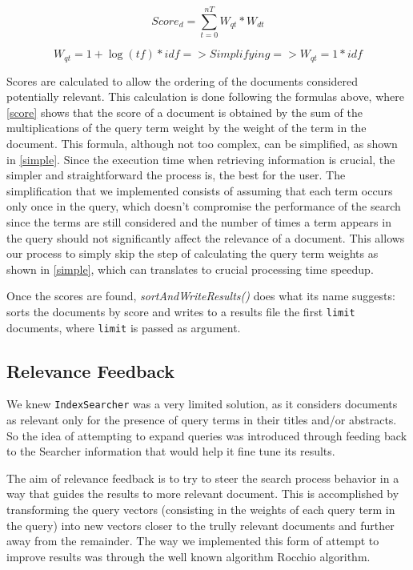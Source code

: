 \documentclass[12pt]{article}
\begin{document}
\begin{equation}
  \label{score}
  Score_{d} = \sum_{t=0}^{nT} W_{qt} * W_{dt}
\end{equation}

\begin{equation}
  \label{simple}
  W_{qt} = 1 + \log(tf) * idf => Simplifying => W_{qt} = 1 * idf
\end{equation}

Scores are calculated to allow the ordering of the documents considered potentially
relevant. This calculation is done following the formulas above, where \ref{score} 
shows that the score of a document is obtained by the sum of the multiplications 
of the query term weight by the weight of the term in the document. 
This formula, although not too complex, can be simplified, as shown in \ref{simple}. 
Since the execution time when retrieving information is crucial, the simpler and 
straightforward the process is, the best for the user. 
The simplification that we implemented consists of assuming that each term occurs 
only once in the query, which doesn't compromise the performance of the search 
since the terms are still considered and the number of times a term appears in 
the query should not significantly affect the relevance of a document. 
This allows our process to simply skip the step of calculating the query term 
weights as shown in \ref{simple}, which can translates to crucial processing time speedup.

Once the scores are found, \textit{sortAndWriteResults()} does what its name 
suggests: sorts the documents by score and writes to a results file the first 
\texttt{limit} documents, where \texttt{limit} is passed as argument.

\subsection{Relevance Feedback}\label{rocchio}

We knew \texttt{IndexSearcher} was a very limited solution, as it considers 
documents as relevant only for the presence of query terms in their titles 
and/or abstracts.
So the idea of attempting to expand queries was introduced through feeding back
to the Searcher information that would help it fine tune its results.

The aim of relevance feedback is to try to steer the search process behavior 
in a way that guides the results to more relevant document.
This is accomplished by transforming the query vectors (consisting in the weights 
of each query term in the query) into new vectors closer to the trully
relevant documents and further away from the remainder.
The way we implemented this form of attempt to improve results was through the
well known algorithm Rocchio algorithm.
\end{document}
